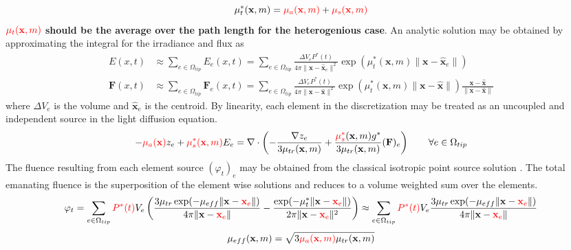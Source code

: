 \documentclass{article}         %
\theoremstyle{definition}
\theoremstyle{remark}
\begin{document}
\[
  \mu_t^*(\textbf{x},m)  = 
                 {\color{red}\mu_a(\textbf{x},m)} + 
                    {\color{red}\mu_s(\textbf{x},m)}  
\]
\textbf{${\color{red}\mu_t(\textbf{x},m)}$ should be the average over
the path length for the heterogenious case}.
An analytic solution may be obtained by approximating the integral for
the irradiance and flux as
\[
\begin{split}
E(x,t) 
  & \approx 
  \sum_{e\in \Omega_{tip}} E_e(x,t)
  =
  \sum_{e\in \Omega_{tip}} 
          \frac{\Delta V_e P^*(t)}{4\pi \|\textbf{x} - \hat{\textbf{x}}_e\|^2}
          \exp\left(\mu_t^*(\textbf{x},m) 
                 \|\textbf{x} - \hat{\textbf{x}}_e\|\right) 
 \\
\textbf{F}(x,t) 
  & \approx 
    \sum_{e\in \Omega_{tip}} \textbf{F}_e(x,t) 
  = \sum_{e\in \Omega_{tip}} 
          \frac{\Delta V_e P^*(t)}{4\pi \|\textbf{x} - \hat{\textbf{x}}\|^2}
          \exp\left(\mu_t^*(\textbf{x},m) 
                         \|\textbf{x} - \hat{\textbf{x}}\|\right) 
\frac{\textbf{x} - \hat{\textbf{x}} }{ \|\textbf{x} - \hat{\textbf{x}}\| }
\end{split} 
\]
where $\Delta V_e$ is the volume and 
$\hat{\textbf{x}}_e$ is the centroid.
By linearity, each element in the discretization may be treated as
an uncoupled and independent source in the light diffusion equation.
\[
 -{\color{red}\mu_a(\textbf{x})} z_e 
 +{\color{red}\mu_s^*(\textbf{x},m)} E_e
 = \nabla \cdot 
   \left( 
   - \frac{ \nabla z_e }{3\mu_{tr}(\textbf{x},m)} 
   + \frac{ {\color{red}\mu_s^*}(\textbf{x},m) g^* }{3\mu_{tr}(\textbf{x},m)} 
       (\textbf{F})_e
   \right) \qquad \forall e \in \Omega_{tip}
\]
The fluence resulting from each element source $(\varphi_t)_e$
may be obtained from the classical isotropic point source
solution \cite{Welch95}.
The total emanating fluence is the superposition of the element wise
solutions and reduces to a volume weighted sum over the elements.
\[
   \varphi_t = \sum_{e \in \Omega_{tip}}
 {\color{red}P^*(t)}  V_e  \left(
   \frac{3\mu_{tr} \exp(-\mu_{eff} \|\textbf{x} -{\color{red}\textbf{x}_e}\|) }
      {4\pi \|\textbf{x}-{\color{red}\textbf{x}_e}\|}
 - 
      \frac{ 
             \exp(-\mu_t^* \|\textbf{x} -{\color{red}\textbf{x}_e}\|) }
           {2\pi \|\textbf{x}-{\color{red}\textbf{x}_e}\|^2}
   \right)
\approx
    \sum_{e \in \Omega_{tip}}
 {\color{red}P^*(t)}  V_e 
   \frac{3\mu_{tr} \exp(-\mu_{eff} \|\textbf{x} -{\color{red}\textbf{x}_e}\|) }
      {4\pi \|\textbf{x}-{\color{red}\textbf{x}_e}\|}
\]
\[
 \mu_{eff}(\textbf{x},m)  = 
           \sqrt{ 3 {\color{red}\mu_a(\textbf{x},m)} \mu_{tr}(\textbf{x},m) }
\]
\end{document}
